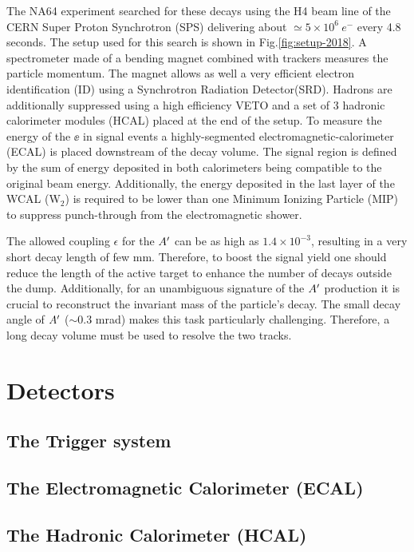 The NA64 experiment searched for these decays using the H4 beam line of the CERN Super Proton Synchrotron (SPS) delivering about  $\simeq 5\times 10^6~e^-$ every 4.8 seconds. The setup used for this search is shown in Fig.\ref{fig:setup-2018}. A spectrometer made of a bending magnet combined with trackers measures the particle momentum. The magnet allows as well a very efficient electron identification (ID) using a Synchrotron Radiation Detector(SRD). Hadrons are additionally suppressed using a high efficiency VETO and a set of 3 hadronic calorimeter modules (HCAL) placed at the end of the setup. To measure the energy of the $\ee$ in signal events a highly-segmented electromagnetic-calorimeter (ECAL) is placed downstream of the decay volume. The signal region is defined by the sum of energy deposited in both calorimeters being compatible to the original beam energy. Additionally, the energy deposited in the last layer of the WCAL (W$_2$) is required to be lower than one Minimum Ionizing Particle (MIP) to suppress punch-through from the electromagnetic shower.

The allowed coupling $\epsilon$ for the $A'$ can be as high as $1.4 \times 10^{-3}$, resulting in a very short decay length of few mm. Therefore, to boost the signal yield one should reduce the length of the active target to enhance the number of decays outside the dump. Additionally, for an unambiguous signature of the $A'$ production it is crucial to reconstruct the invariant mass of the particle's decay. The small decay angle of $A'$ ($\sim$0.3 mrad) makes this task particularly challenging. Therefore, a long decay volume must be used to resolve the two tracks.

\section{Detectors}
\label{chapter2:sec:detectors}

\subsection{The Trigger system}
\label{chapter2:sec:detectors-trigger}

\subsection{The Electromagnetic Calorimeter (ECAL)}
\label{chapter2:sec:detectors-ecal}

\subsection{The Hadronic Calorimeter (HCAL)}
\label{chapter2:sec:detectors-hcal}

